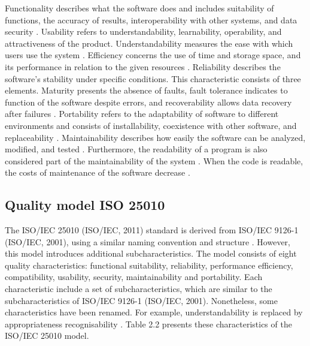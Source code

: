 Functionality describes what the software does and includes suitability of functions, the accuracy of results, interoperability with other systems, and data security \cite{spinellis2006code}. Usability refers to understandability, learnability, operability, and attractiveness of the product. Understandability measures the ease with which users use the system \cite{dugalic2012iso}. Efficiency concerns the use of time and storage space, and its performance in relation to the given resources \cite{dugalic2012iso}. Reliability describes the software’s stability under specific conditions. This characteristic consists of three elements. Maturity presents the absence of faults, fault tolerance indicates to function of the software despite errors, and recoverability allows data recovery after failures \cite{spinellis2006code}. Portability refers to the adaptability of software to different environments and consists of installability,  coexistence with other software, and replaceability \cite{spinellis2006code}. Maintainability describes how easily the software can be analyzed, modified, and tested \cite{spinellis2006code}. Furthermore, the readability of a program is also considered part of the maintainability of the system \cite{buse2009learning}.  When the code is readable, the costs of maintenance of the software decrease \cite{sedano2016code}.





\subsection{Quality model ISO 25010 }


The ISO/IEC 25010 (ISO/IEC, 2011) standard is derived from ISO/IEC 9126-1 (ISO/IEC, 2001), using a similar naming convention and structure \cite{zapata2013development}. However, this model introduces additional subcharacteristics. The model consists of eight quality characteristics: functional suitability, reliability, performance efficiency, compatibility, usability, security, maintainability and portability.  
Each characteristic include a set of subcharacteristics, which are similar to the subcharacteristics of ISO/IEC 9126-1 (ISO/IEC, 2001). Nonetheless, some characteristics  have been renamed. For example, understandability is replaced by appropriateness recognisability \cite{zapata2013development}. Table 2.2 presents these characteristics of the ISO/IEC 25010 model.



